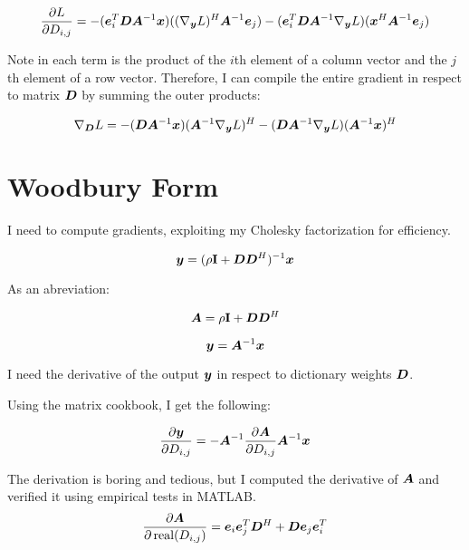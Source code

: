 \documentclass{article}
\begin{document}
\begin{equation}
\frac{\partial L}{\partial D_{i,j}} = -(\bm{e}_i^T\bm{D}\bm{A}^{-1}\bm{x})((\nabla_{\bm{y}} L)^H\bm{A}^{-1}\bm{e}_j) - (\bm{e}_i^T\bm{D}\bm{A}^{-1}\nabla_{\bm{y}} L)(\bm{x}^H\bm{A}^{-1}\bm{e}_j)
\end{equation}

Note in each term is the product of the $i$th element of a column vector and the $j$th element of a row vector. Therefore, I can compile the entire gradient in respect to matrix $\bm{D}$ by summing the outer products:

\begin{equation}
\nabla_{\bm{D}} L = -(\bm{D}\bm{A}^{-1}\bm{x})(\bm{A}^{-1}\nabla_{\bm{y}} L)^H - (\bm{D}\bm{A}^{-1}\nabla_{\bm{y}} L)(\bm{A}^{-1}\bm{x})^H
\end{equation}


\section{Woodbury Form}

I need to compute gradients, exploiting my Cholesky factorization for efficiency.

\begin{equation}
\bm{y} = (\rho{\bf I} + \bm{D}\bm{D}^H)^{-1}\bm{x}
\end{equation}

As an abreviation:

\begin{equation}
\bm{A} = \rho{\bf I} + \bm{D}\bm{D}^H
\end{equation}

\begin{equation}
\bm{y} = \bm{A}^{-1}\bm{x}
\end{equation}

I need the derivative of the output $\bm{y}$ in respect to dictionary weights $\bm{D}$.

Using the matrix cookbook, I get the following:

\begin{equation}
\frac{\partial \bm{y}}{\partial D_{i,j}} = -\bm{A}^{-1} \frac{\partial \bm{A}}{\partial D_{i,j}} \bm{A}^{-1}\bm{x}
\end{equation}

The derivation is boring and tedious, but I computed the derivative of $\bm{A}$ and verified it using empirical tests in MATLAB.
\begin{equation}
\frac{\partial \bm{A}}{\partial \operatorname{real}(D_{i,j})} = \bm{e}_i\bm{e}_j^T\bm{D}^H + \bm{D}\bm{e}_j\bm{e}_i^T
\end{equation}
\end{document}
